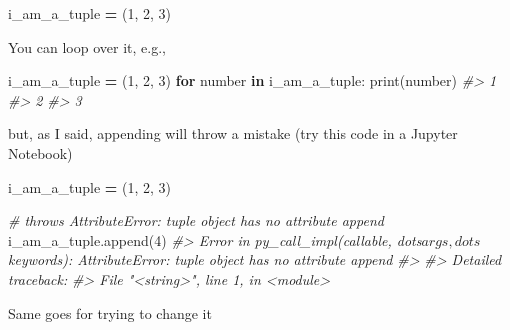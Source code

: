 \documentclass[
]{book}
\newenvironment{Shaded}{\begin{snugshade}}{\end{snugshade}}
\newcommand{\BuiltInTok}[1]{#1}
\newcommand{\CommentTok}[1]{\textcolor[rgb]{0.56,0.35,0.01}{\textit{#1}}}
\newcommand{\ControlFlowTok}[1]{\textcolor[rgb]{0.13,0.29,0.53}{\textbf{#1}}}
\newcommand{\DecValTok}[1]{\textcolor[rgb]{0.00,0.00,0.81}{#1}}
\newcommand{\KeywordTok}[1]{\textcolor[rgb]{0.13,0.29,0.53}{\textbf{#1}}}
\newcommand{\NormalTok}[1]{#1}
\newcommand{\OperatorTok}[1]{\textcolor[rgb]{0.81,0.36,0.00}{\textbf{#1}}}
\begin{document}
\begin{Shaded}
\begin{Highlighting}[]
\NormalTok{i\_am\_a\_tuple }\OperatorTok{=}\NormalTok{ (}\DecValTok{1}\NormalTok{, }\DecValTok{2}\NormalTok{, }\DecValTok{3}\NormalTok{)}
\end{Highlighting}
\end{Shaded}

You can loop over it, e.g.,

\begin{Shaded}
\begin{Highlighting}[]
\NormalTok{i\_am\_a\_tuple }\OperatorTok{=}\NormalTok{ (}\DecValTok{1}\NormalTok{, }\DecValTok{2}\NormalTok{, }\DecValTok{3}\NormalTok{)}
\ControlFlowTok{for}\NormalTok{ number }\KeywordTok{in}\NormalTok{ i\_am\_a\_tuple:}
    \BuiltInTok{print}\NormalTok{(number)}
\CommentTok{\#\textgreater{} 1}
\CommentTok{\#\textgreater{} 2}
\CommentTok{\#\textgreater{} 3}
\end{Highlighting}
\end{Shaded}

but, as I said, appending will throw a mistake (try this code in a Jupyter Notebook)

\begin{Shaded}
\begin{Highlighting}[]
\NormalTok{i\_am\_a\_tuple }\OperatorTok{=}\NormalTok{ (}\DecValTok{1}\NormalTok{, }\DecValTok{2}\NormalTok{, }\DecValTok{3}\NormalTok{)}

\CommentTok{\# throws AttributeError: \textquotesingle{}tuple\textquotesingle{} object has no attribute \textquotesingle{}append\textquotesingle{}}
\NormalTok{i\_am\_a\_tuple.append(}\DecValTok{4}\NormalTok{)}
\CommentTok{\#\textgreater{} Error in py\_call\_impl(callable, dots$args, dots$keywords): AttributeError: \textquotesingle{}tuple\textquotesingle{} object has no attribute \textquotesingle{}append\textquotesingle{}}
\CommentTok{\#\textgreater{} }
\CommentTok{\#\textgreater{} Detailed traceback:}
\CommentTok{\#\textgreater{}   File "\textless{}string\textgreater{}", line 1, in \textless{}module\textgreater{}}
\end{Highlighting}
\end{Shaded}

Same goes for trying to change it
\end{document}
